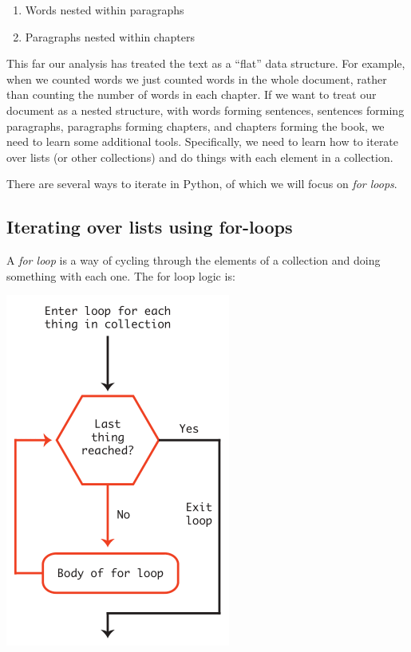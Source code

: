 \documentclass[
]{book}
\providecommand{\tightlist}{%
  \setlength{\itemsep}{0pt}\setlength{\parskip}{0pt}}
\begin{document}
\begin{enumerate}
\def\labelenumi{\arabic{enumi}.}
\tightlist
\item
  Words nested within paragraphs
\item
  Paragraphs nested within chapters
\end{enumerate}

This far our analysis has treated the text as a ``flat'' data structure. For example, when we counted words we just counted words in the whole document, rather than counting the number of words in each chapter. If we want to treat our document as a nested structure, with words forming sentences, sentences forming paragraphs, paragraphs forming chapters, and chapters forming the book, we need to learn some additional tools. Specifically, we need to learn how to iterate over lists (or other collections) and do things with each element in a collection.

There are several ways to iterate in Python, of which we will focus on \emph{for loops}.

\hypertarget{iterating-over-lists-using-for-loops}{%
\subsection{Iterating over lists using for-loops}\label{iterating-over-lists-using-for-loops}}

A \emph{for loop} is a way of cycling through the elements of a collection and doing something with each one. The for loop logic is:

\includegraphics{Python/PythonIntro/images/for_loop_pic_small.png}
\end{document}
